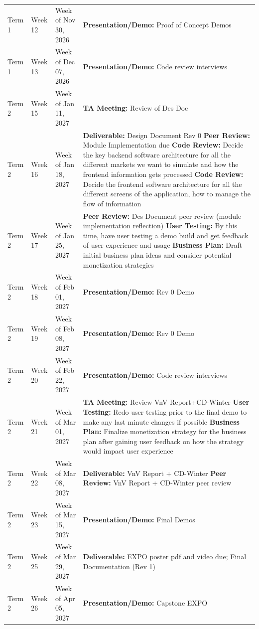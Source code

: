 \documentclass{article}
\begin{document}
\begin{xltabular}{\textwidth}{lll>{\raggedright\arraybackslash}X}
\addlinespace
Term 1 & Week 12 & Week of Nov 30, 2026 & \textbf{Presentation/Demo:} Proof of Concept Demos\\
\addlinespace
Term 1 & Week 13 & Week of Dec 07, 2026 & \textbf{Presentation/Demo:} Code review interviews\\
\midrule
Term 2 & Week 15 & Week of Jan 11, 2027 & \textbf{TA Meeting:} Review of Des Doc\\
\addlinespace
Term 2 & Week 16 & Week of Jan 18, 2027 & \textbf{Deliverable:} Design Document Rev 0 \newline \textbf{Peer Review:} Module Implementation due \newline \textbf{Code Review:} Decide the key backend software architecture for all the different markets we want to simulate and how the frontend information gets processed \newline \textbf{Code Review:} Decide the frontend software architecture for all the different screens of the application, how to manage the flow of information\\
\addlinespace
Term 2 & Week 17 & Week of Jan 25, 2027 & \textbf{Peer Review:} Des Document peer review (module implementation reflection) \newline \textbf{User Testing:} By this time, have user testing a demo build and get feedback of user experience and usage \newline \textbf{Business Plan:} Draft initial business plan ideas and consider potential monetization strategies\\
\addlinespace
Term 2 & Week 18 & Week of Feb 01, 2027 & \textbf{Presentation/Demo:} Rev 0 Demo\\
\addlinespace
Term 2 & Week 19 & Week of Feb 08, 2027 & \textbf{Presentation/Demo:} Rev 0 Demo\\
\addlinespace
Term 2 & Week 20 & Week of Feb 22, 2027 & \textbf{Presentation/Demo:} Code review interviews\\
\addlinespace
Term 2 & Week 21 & Week of Mar 01, 2027 & \textbf{TA Meeting:} Review VnV Report+CD-Winter \newline \textbf{User Testing:} Redo user testing prior to the final demo to make any last minute changes if possible \newline \textbf{Business Plan:} Finalize monetization strategy for the business plan after gaining user feedback on how the strategy would impact user experience\\
\addlinespace
Term 2 & Week 22 & Week of Mar 08, 2027 & \textbf{Deliverable:} VnV Report + CD-Winter \newline \textbf{Peer Review:} VnV Report + CD-Winter peer review\\
\addlinespace
Term 2 & Week 23 & Week of Mar 15, 2027 & \textbf{Presentation/Demo:} Final Demos\\
\addlinespace
Term 2 & Week 25 & Week of Mar 29, 2027 & \textbf{Deliverable:} EXPO poster pdf and video due; Final Documentation (Rev 1)\\
\addlinespace
Term 2 & Week 26 & Week of Apr 05, 2027 & \textbf{Presentation/Demo:} Capstone EXPO\\
\end{xltabular}
\end{document}
